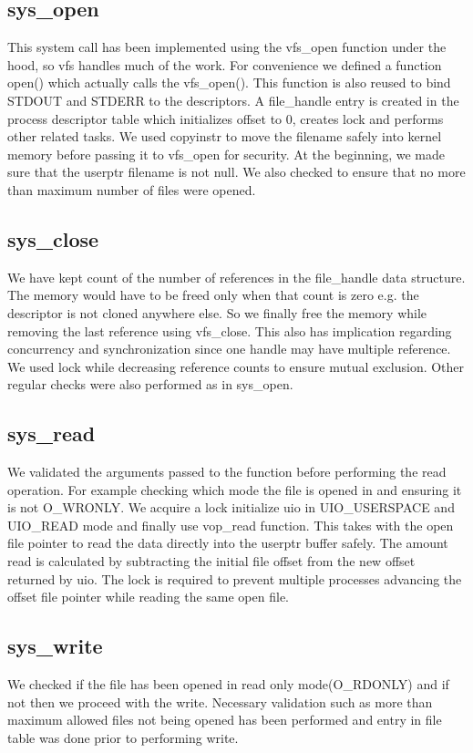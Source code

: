 \documentclass[11pt, english]{article}
\begin{document}
\subsection{sys\_open}
 This system call has been implemented using the vfs\_open function under the hood, so 
 vfs handles much of the work. For convenience we defined a function open() which actually calls the vfs\_open(). This function is also reused to bind STDOUT and STDERR to the descriptors.
 A file\_handle entry is created in the process descriptor table which initializes offset to 0, creates lock and performs other related tasks. We used copyinstr to move the filename safely into kernel memory before passing it to vfs\_open for security.
At the beginning, we made sure that the userptr filename is not null. We also checked to ensure that no more than maximum number of files were opened.

\subsection{sys\_close}
 We have kept count of the number of references in the file\_handle data structure. The memory would have to be freed only when that count is zero e.g. the descriptor is not cloned anywhere else. So we finally free the memory while removing the last reference using vfs\_close. This also has implication regarding concurrency and synchronization since one handle may have multiple reference. We used lock while decreasing reference counts to ensure mutual exclusion. Other regular checks were also performed as in sys\_open.


\subsection{sys\_read}
 We validated the arguments passed to the function before performing the read operation. For example checking which mode the file is opened in and ensuring it is not O\_WRONLY. We acquire a lock initialize uio in UIO\_USERSPACE and UIO\_READ mode and finally use vop\_read function. This takes with the open file pointer to read the data directly into the userptr buffer safely. The amount read is calculated by subtracting the initial file offset from the new offset returned by uio. The lock is required to prevent multiple processes advancing the offset file pointer while reading the same open file.

\subsection{sys\_write}
We checked if the file has been opened in read only mode(O\_RDONLY) and if not then we proceed with the write.
Necessary validation such as more than maximum allowed files not being opened has been performed and entry in file table was done prior to performing write.
\end{document}

